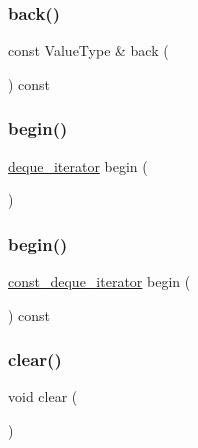 \mbox{\label{classDeque_adc761c91bdacd01bed5c96e25fd9486a}} 
\subsubsection{\texorpdfstring{back()}{back()}}
{\footnotesize\ttfamily const Value\+Type \& back (\begin{DoxyParamCaption}{ }\end{DoxyParamCaption}) const}

\mbox{\label{classDeque_ab0616f247b41eeb1a672421386fd5612}} 
\subsubsection{\texorpdfstring{begin()}{begin()}\hspace{0.1cm}{\footnotesize\ttfamily [1/2]}}
{\footnotesize\ttfamily \mbox{\hyperlink{classDeque_1_1deque__iterator}{deque\+\_\+iterator}} begin (\begin{DoxyParamCaption}{ }\end{DoxyParamCaption})\hspace{0.3cm}{\ttfamily [inline]}}

\mbox{\label{classDeque_a92be94822f29cf2d75f992e50763f34d}} 
\subsubsection{\texorpdfstring{begin()}{begin()}\hspace{0.1cm}{\footnotesize\ttfamily [2/2]}}
{\footnotesize\ttfamily \mbox{\hyperlink{classDeque_1_1const__deque__iterator}{const\+\_\+deque\+\_\+iterator}} begin (\begin{DoxyParamCaption}{ }\end{DoxyParamCaption}) const\hspace{0.3cm}{\ttfamily [inline]}}

\mbox{\label{classDeque_ac8bb3912a3ce86b15842e79d0b421204}} 
\subsubsection{\texorpdfstring{clear()}{clear()}}
{\footnotesize\ttfamily void clear (\begin{DoxyParamCaption}{ }\end{DoxyParamCaption})}

